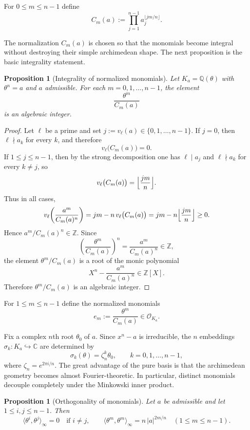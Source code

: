 \documentclass[11pt,letterpaper]{amsart}
\newcommand{\Q}{\mathbb{Q}}
\newcommand{\Z}{\mathbb{Z}}
\newcommand{\C}{\mathbb{C}}
\newcommand{\cO}{\mathcal{O}}
\theoremstyle{plain}
\newtheorem{proposition}[theorem]{Proposition}
\theoremstyle{definition}
\begin{document}
For $0\le m\le n-1$ define
\begin{equation}\label{eq:Cm-def}
C_m(a):=\prod_{j=1}^{n-1} a_j^{\lfloor jm/n\rfloor}.
\end{equation}

The normalization \(C_m(a)\) is chosen so that the monomials become integral without destroying their simple archimedean shape. The next proposition is the basic integrality statement.


\begin{proposition}[Integrality of normalized monomials]\label{prop:integrality-em}
Let $K_a=\Q(\theta)$ with $\theta^n=a$ and $a$ admissible.
For each $m=0,1,\dots,n-1$, the element
\[
\frac{\theta^m}{C_m(a)}
\]
is an algebraic integer.
\end{proposition}

\begin{proof}
Let $\ell$ be a prime and set $j:=v_\ell(a)\in\{0,1,\dots,n-1\}$.
If $j=0$, then $\ell\nmid a_k$ for every $k$, and therefore
\[
v_\ell\bigl(C_m(a)\bigr)=0.
\]
If $1\le j\le n-1$, then by the strong decomposition one has $\ell\mid a_j$ and $\ell\nmid a_k$ for every
$k\neq j$, so
\[
v_\ell\bigl(C_m(a)\bigr)=\Bigl\lfloor\frac{jm}{n}\Bigr\rfloor.
\]
Thus in all cases,
\[
v_\ell\!\left(\frac{a^m}{C_m(a)^n}\right)
=jm-n\,v_\ell\bigl(C_m(a)\bigr)
=jm-n\Bigl\lfloor\frac{jm}{n}\Bigr\rfloor\ge 0.
\]
Hence $a^m/C_m(a)^n\in \Z$.
Since
\[
\left(\frac{\theta^m}{C_m(a)}\right)^n=\frac{a^m}{C_m(a)^n}\in \Z,
\]
the element $\theta^m/C_m(a)$ is a root of the monic polynomial
\[
X^n-\frac{a^m}{C_m(a)^n}\in \Z[X].
\]
Therefore $\theta^m/C_m(a)$ is an algebraic integer.
\end{proof}

For $1\le m\le n-1$ define the normalized monomials
\begin{equation}\label{eq:em-def}
e_m:=\frac{\theta^m}{C_m(a)}\in \cO_{K_a}.
\end{equation}

Fix a complex $n$th root $\theta_0$ of $a$.
Since $x^n-a$ is irreducible, the $n$ embeddings $\sigma_k:K_a\hookrightarrow\C$ are determined by
\[
\sigma_k(\theta)=\zeta_n^k\theta_0,\qquad k=0,1,\dots,n-1,
\]
where $\zeta_n=e^{2\pi i/n}$. The great advantage of the pure basis is that the archimedean geometry becomes almost Fourier-theoretic. In particular, distinct monomials decouple completely under the Minkowski inner product.


\begin{proposition}[Orthogonality of monomials]\label{prop:orthogonality}
Let $a$ be admissible and let $1\le i,j\le n-1$.
Then
\[
\langle \theta^i,\theta^j\rangle_\infty=0\quad\text{if }i\neq j,
\qquad
\langle \theta^m,\theta^m\rangle_\infty=n\,|a|^{2m/n}\quad(1\le m\le n-1).
\]
\end{proposition}
\end{document}
